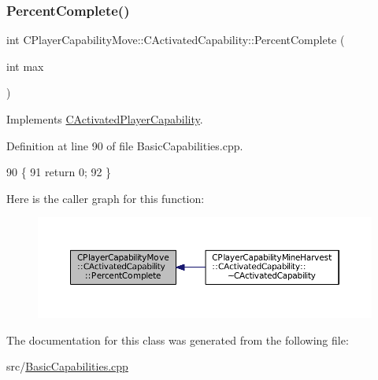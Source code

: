 \hypertarget{classCPlayerCapabilityMove_1_1CActivatedCapability_a1696dd16d89d0978284a95dd1531d0d5}{}\label{classCPlayerCapabilityMove_1_1CActivatedCapability_a1696dd16d89d0978284a95dd1531d0d5} 
\subsubsection{\texorpdfstring{Percent\+Complete()}{PercentComplete()}}
{\footnotesize\ttfamily int C\+Player\+Capability\+Move\+::\+C\+Activated\+Capability\+::\+Percent\+Complete (\begin{DoxyParamCaption}\item[{int}]{max }\end{DoxyParamCaption})\hspace{0.3cm}{\ttfamily [virtual]}}



Implements \hyperlink{classCActivatedPlayerCapability_a405dc6076058006a4f801727de4cfe4d}{C\+Activated\+Player\+Capability}.



Definition at line 90 of file Basic\+Capabilities.\+cpp.


\begin{DoxyCode}
90                                                                      \{
91     \textcolor{keywordflow}{return} 0;
92 \}
\end{DoxyCode}
Here is the caller graph for this function\+:
\nopagebreak
\begin{figure}[H]
\begin{center}
\leavevmode
\includegraphics[width=350pt]{classCPlayerCapabilityMove_1_1CActivatedCapability_a1696dd16d89d0978284a95dd1531d0d5_icgraph}
\end{center}
\end{figure}


The documentation for this class was generated from the following file\+:\begin{DoxyCompactItemize}
\item 
src/\hyperlink{BasicCapabilities_8cpp}{Basic\+Capabilities.\+cpp}\end{DoxyCompactItemize}
